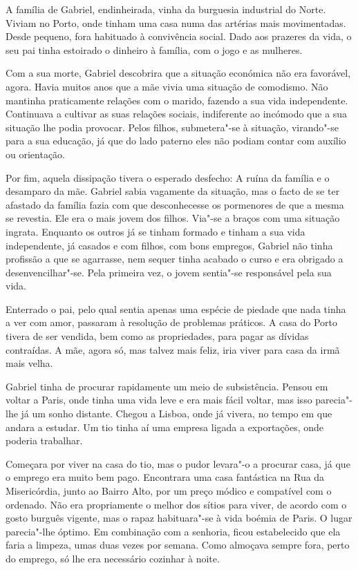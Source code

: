 A família de Gabriel, endinheirada, vinha da burguesia industrial do
Norte. Viviam no Porto, onde tinham uma casa numa das artérias mais
movimentadas. Desde pequeno, fora habituado à convivência social. Dado
aos prazeres da vida, o seu pai tinha estoirado o dinheiro à família,
com o jogo e as mulheres.

Com a sua morte, Gabriel descobrira que a situação económica não era
favorável, agora. Havia muitos anos que a mãe vivia uma situação de
comodismo. Não mantinha praticamente relações com o marido, fazendo a
sua vida independente. Continuava a cultivar as suas relações sociais,
indiferente ao incómodo que a sua situação lhe podia provocar. Pelos
filhos, submetera"-se à situação, virando"-se para a sua educação, já que
do lado paterno eles não podiam contar com auxílio ou orientação.

Por fim, aquela dissipação tivera o esperado desfecho: A ruína da
família e o desamparo da mãe. Gabriel sabia vagamente da situação, mas o
facto de se ter afastado da família fazia com que desconhecesse os
pormenores de que a mesma se revestia. Ele era o mais jovem dos filhos.
Via"-se a braços com uma situação ingrata. Enquanto os outros já se
tinham formado e tinham a sua vida independente, já casados e com
filhos, com bons empregos, Gabriel não tinha profissão a que se
agarrasse, nem sequer tinha acabado o curso e era obrigado a
desenvencilhar"-se. Pela primeira vez, o jovem sentia"-se responsável pela
sua vida.

Enterrado o pai, pelo qual sentia apenas uma espécie de piedade que nada
tinha a ver com amor, passaram à resolução de problemas práticos. A casa
do Porto tivera de ser vendida, bem como as propriedades, para pagar as
dívidas contraídas. A mãe, agora só, mas talvez mais feliz, iria viver
para casa da irmã mais velha.

Gabriel tinha de procurar rapidamente um meio de subsistência. Pensou em
voltar a Paris, onde tinha uma vida leve e era mais fácil voltar, mas
isso parecia"-lhe já um sonho distante. Chegou a Lisboa, onde já vivera,
no tempo em que andara a estudar. Um tio tinha aí uma empresa ligada a
exportações, onde poderia trabalhar.

Começara por viver na casa do tio, mas o pudor levara"-o a procurar casa,
já que o emprego era muito bem pago. Encontrara uma casa fantástica na
Rua da Misericórdia, junto ao Bairro Alto, por um preço módico e
compatível com o ordenado. Não era propriamente o melhor dos sítios para
viver, de acordo com o gosto burguês vigente, mas o rapaz habituara"-se à
vida boémia de Paris. O lugar parecia"-lhe óptimo. Em combinação com a
senhoria, ficou estabelecido que ela faria a limpeza, umas duas vezes
por semana. Como almoçava sempre fora, perto do emprego, só lhe era
necessário cozinhar à noite.

